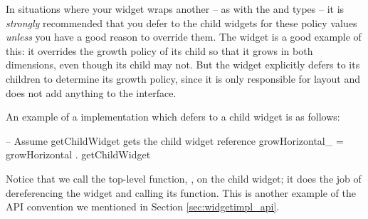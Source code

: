 In situations where your widget wraps another -- as with the 
and  types -- it is \textit{strongly} recommended that
you defer to the child widgets for these policy values \textit{unless}
you have a good reason to override them.  The  widget is
a good example of this: it overrides the growth policy of its child so
that it grows in both dimensions, even though its child may not.  But
the  widget explicitly defers to its children to determine its
growth policy, since it is only responsible for layout and does not
add anything to the interface.

An example of a  implementation which defers to a
child widget is as follows:

\begin{haskellcode}
 -- Assume getChildWidget gets the child widget reference
 growHorizontal_ = growHorizontal . getChildWidget
\end{haskellcode}

Notice that we call the top-level function, , on
the child widget; it does the job of dereferencing the widget and
calling its  function.  This is another example
of the API convention we mentioned in Section
\ref{sec:widgetimpl_api}.
